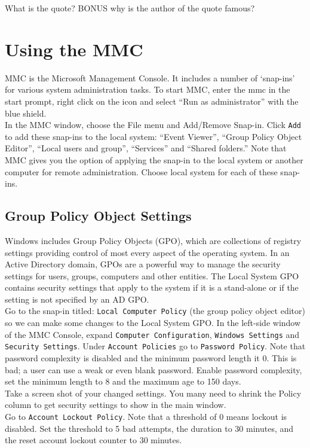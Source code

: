 \documentclass{article}
\begin{document}
\question What is the quote?  BONUS why is the author of the quote famous?

\section{Using the MMC}
MMC is the Microsoft Management Console. It includes a number of `snap-ins' for various system administration tasks.  To start MMC, enter the mmc in the start prompt, right click on the icon and select ``Run as administrator'' with the blue shield.\\
\indent In the MMC window, choose the File menu and Add/Remove Snap-in. Click {\tt Add} to add these snap-ins to the local system: ``Event Viewer'', ``Group Policy Object Editor'', ``Local users and group'', ``Services'' and ``Shared folders.'' Note that MMC gives you the option of applying the snap-in to the local system or another computer for remote administration. Choose local system for each of these snap-ins.
\subsection{Group Policy Object Settings}
Windows includes Group Policy Objects (GPO), which are collections of registry settings providing control of most every aspect of the operating system. In an Active Directory domain, GPOs are a powerful way to manage the security settings for users, groups, computers and other entities. The Local System GPO contains security settings that apply to the system if it is a stand-alone or if the setting is not specified by an AD GPO. \\
Go to the snap-in titled: {\tt Local Computer Policy} (the group policy object editor) so we can make some changes to the Local System GPO. In the left-side window of the MMC Console, expand {\tt Computer Configuration},  {\tt Windows Settings} and {\tt Security Settings}. Under {\tt Account Policies} go to {\tt Password Policy}. Note that password complexity is disabled and the minimum password length it 0. This is bad; a user can use a weak or even blank password. Enable password complexity, set the minimum length to 8 and the maximum age to 150 days.\\

\question Take a screen shot of your changed settings. You many need to shrink the Policy column to get security settings to show in the main window. \\

Go to {\tt Account Lockout Policy}. Note that a threshold of 0 means lockout is disabled. Set the threshold to 5 bad attempts, the duration to 30 minutes, and the reset account lockout counter to 30 minutes. \\ 
\end{document}
